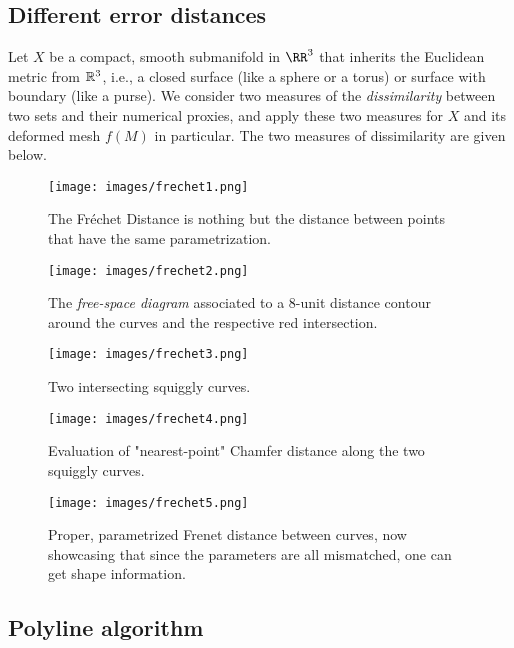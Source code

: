 \subsection{Different error distances}

Let $X$ be a compact, smooth submanifold in $\RR^3$ 
that inherits the Euclidean metric from $\mathbb{R}^3$, i.e., a closed
surface (like a sphere or a torus) or surface with boundary (like 
a purse). We consider two measures of the \emph{dissimilarity} between 
two sets and their numerical proxies, and apply these two 
measures for $X$ and its deformed mesh $f(M)$ in particular. The 
two measures of dissimilarity are given below.


\begin{figure}
    \centering
    \texttt{[image: images/frechet1.png]}
    \caption{The Fréchet Distance is nothing but the distance between
    points that have the same parametrization.}
\end{figure}

\begin{figure}[h]
    \centering
    \texttt{[image: images/frechet2.png]}
    \caption{The \emph{free-space diagram} associated to a 
    8-unit distance contour around the curves and the respective
    red intersection.}
\end{figure}

\begin{figure}[h]
    \centering
    \texttt{[image: images/frechet3.png]}
    \caption{Two intersecting squiggly curves.}
    \label{fig:enter-label}
\end{figure}


\begin{figure}[h]
    \centering
    \texttt{[image: images/frechet4.png]}
    \caption{Evaluation of "nearest-point" Chamfer distance along the
    two squiggly curves.}
\end{figure}


\begin{figure}[h]
    \centering
    \texttt{[image: images/frechet5.png]}
    \caption{Proper, parametrized Frenet distance between curves, now
    showcasing that since the parameters are all mismatched, one can get
    shape information.}
\end{figure}


\subsection{Polyline algorithm}


